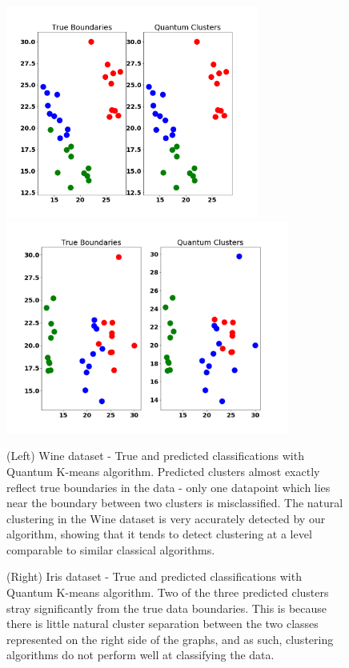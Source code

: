 \documentclass[twocolumn, english]{revtex4-2}
\begin{document}
\begin{figure}
\includegraphics[height=7cm]{Figure_Wine1}
\includegraphics[height=7cm]{Figure_Iris1}
\caption{(Left) Wine dataset - True and predicted classifications with Quantum K-means algorithm. Predicted clusters almost exactly reflect true boundaries in the data - only one datapoint which lies near the boundary between two clusters is misclassified. The natural clustering in the Wine dataset is very accurately detected by our algorithm, showing that it tends to detect clustering at a level comparable to similar classical algorithms.}
\caption{(Right) Iris dataset - True and predicted classifications with Quantum K-means algorithm. Two of the three predicted clusters stray significantly from the true data boundaries. This is because there is little natural cluster separation between the two classes represented on the right side of the graphs, and as such, clustering algorithms do not perform well at classifying the data.}
\end{figure}
\end{document}
